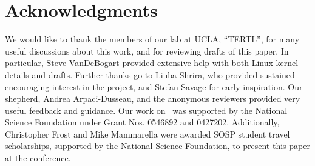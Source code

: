 \section*{Acknowledgments}

We would like to thank the members of our lab at UCLA, ``TERTL'', for many
useful discussions about this work, and for reviewing drafts of this paper. In
particular, Steve VanDeBogart provided extensive help with both Linux
kernel details and drafts. Further thanks go to Liuba
Shrira, who provided sustained encouraging interest in the project, and
Stefan Savage for early inspiration.
Our shepherd, Andrea Arpaci-Dusseau, and the anonymous reviewers
provided very useful feedback and guidance.
%
Our work on \Kudos\ was supported by the National Science
 Foundation under Grant Nos. 0546892 and 0427202.
%
Additionally, Christopher Frost and Mike Mammarella were awarded SOSP student
travel scholarships, supported by the National Science Foundation, to present
this paper at the conference.
